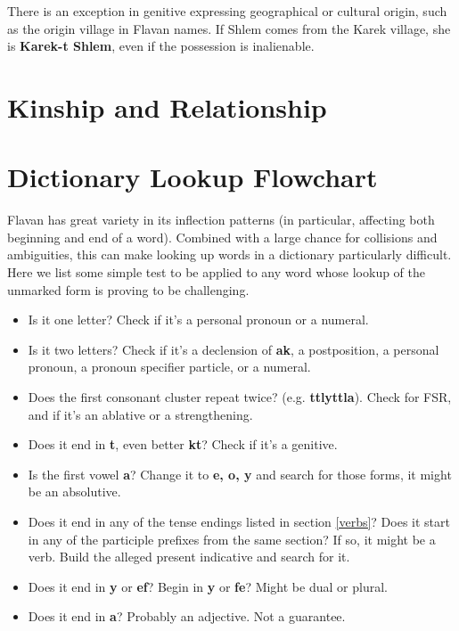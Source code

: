 \documentclass[10pt,oneside]{memoir}
\newcommand{\fsr}{FSR}
\begin{document}
There is an exception in genitive expressing geographical or cultural origin, such as the origin village in Flavan names. If Shlem comes from the Karek village, she is \textbf{Karek-t Shlem}, even if the possession is inalienable.



\section{Kinship and Relationship}



\pagebreak
\section{Dictionary Lookup Flowchart}

Flavan has great variety in its inflection patterns (in particular, affecting both beginning and end of a word). Combined with a large chance for collisions and ambiguities, this can make looking up words in a dictionary particularly difficult. Here we list some simple test to be applied to any word whose lookup of the unmarked form is proving to be challenging.

\begin{itemize}
    \item Is it one letter? Check if it's a personal pronoun or a numeral.
    \item Is it two letters? Check if it's a declension of \textbf{ak}, a postposition, a personal pronoun, a pronoun specifier particle, or a numeral.
    \item Does the first consonant cluster repeat twice? (e.g. \textbf{ttlyttla}). Check for \fsr , and if it's an ablative or a strengthening.
    \item Does it end in \textbf{t}, even better \textbf{kt}? Check if it's a genitive.
    \item Is the first vowel \textbf{a}? Change it to \textbf{e, o, y} and search for those forms, it might be an absolutive.
    \item Does it end in any of the tense endings listed in section \ref{verbs}? Does it start in any of the participle prefixes from the same section? If so, it might be a verb. Build the alleged present indicative and search for it.
    \item Does it end in \textbf{y} or \textbf{ef}? Begin in \textbf{y} or \textbf{fe}? Might be dual or plural.
    \item Does it end in \textbf{a}? Probably an adjective. Not a guarantee.
\end{itemize}
\end{document}
